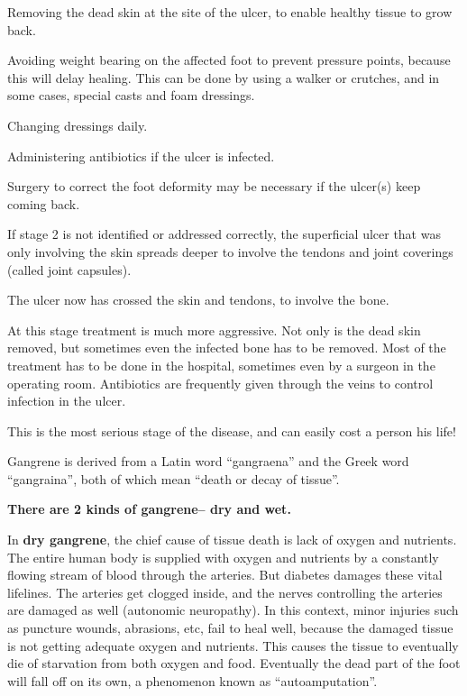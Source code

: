 \item Removing the dead skin at the site of the ulcer, to enable healthy tissue to grow back.

 \item Avoiding weight bearing on the affected foot to prevent pressure points, because this will delay healing. This can be done by using a walker or crutches, and in some cases, special casts and foam dressings.

 \item Changing dressings daily.

 \item Administering antibiotics if the ulcer is infected.

 \item Surgery to correct the foot deformity may be necessary if the ulcer(s) keep coming back.


If stage 2 is not identified or addressed correctly, the superficial ulcer that was only involving the skin spreads deeper to involve the tendons and joint coverings (called joint capsules).


The ulcer now has crossed the skin and tendons, to involve the bone.

At this stage treatment is much more aggressive. Not only is the dead skin removed, but sometimes even the infected bone has to be removed. Most of the treatment has to be done in the hospital, sometimes even by a surgeon in the operating room. Antibiotics are frequently given through the veins to control infection in the ulcer.


This is the most serious stage of the disease, and can easily cost a person his life!

Gangrene is derived from a Latin word “gangraena” and the Greek word “gangraina”, both of which mean “death or decay of tissue”.

\textbf{There are 2 kinds of gangrene– dry and wet.}

In \textbf{dry gangrene}, the chief cause of tissue death is lack of oxygen and nutrients. The entire human body is supplied with oxygen and nutrients by a constantly flowing stream of blood through the arteries. But diabetes damages these vital lifelines. The arteries get clogged inside, and the nerves controlling the arteries are damaged as well (autonomic neuropathy). In this context, minor injuries such as puncture wounds, abrasions, etc, fail to heal well, because the damaged tissue is not getting adequate oxygen and nutrients. This causes the tissue to eventually die of starvation from both oxygen and food. Eventually the dead part of the foot will fall off on its own, a phenomenon known as “autoamputation”.

